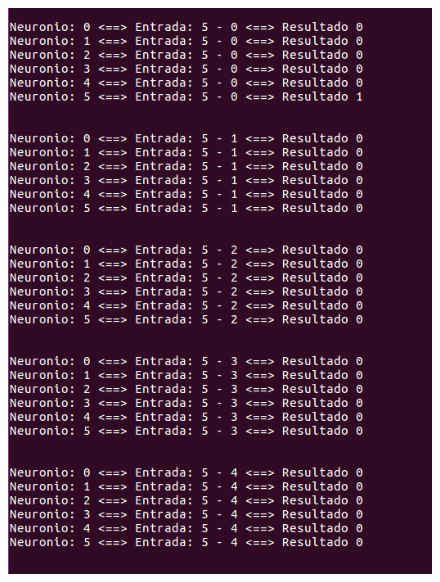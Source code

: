 \documentclass[hidelinks,12pt]{article}
\begin{document}
		\begin{figure}[!h]
			\centering
			\includegraphics[scale=0.5]{Figures/E3S5P1R.png}
		\end{figure}
		
\end{document}
